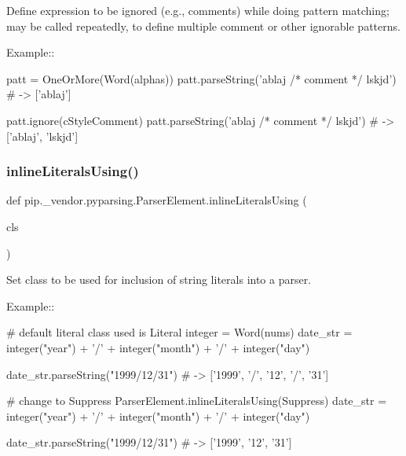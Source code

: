 \begin{DoxyVerb}Define expression to be ignored (e.g., comments) while doing pattern
matching; may be called repeatedly, to define multiple comment or other
ignorable patterns.

Example::

    patt = OneOrMore(Word(alphas))
    patt.parseString('ablaj /* comment */ lskjd') # -> ['ablaj']

    patt.ignore(cStyleComment)
    patt.parseString('ablaj /* comment */ lskjd') # -> ['ablaj', 'lskjd']
\end{DoxyVerb}
 \mbox{\label{classpip_1_1__vendor_1_1pyparsing_1_1ParserElement_abf245d50cf0b9de45b5453647caa1b71}} 
\subsubsection{\texorpdfstring{inline\+Literals\+Using()}{inlineLiteralsUsing()}}
{\footnotesize\ttfamily def pip.\+\_\+vendor.\+pyparsing.\+Parser\+Element.\+inline\+Literals\+Using (\begin{DoxyParamCaption}\item[{}]{cls }\end{DoxyParamCaption})\hspace{0.3cm}{\ttfamily [static]}}

\begin{DoxyVerb}Set class to be used for inclusion of string literals into a parser.

Example::

    # default literal class used is Literal
    integer = Word(nums)
    date_str = integer("year") + '/' + integer("month") + '/' + integer("day")

    date_str.parseString("1999/12/31")  # -> ['1999', '/', '12', '/', '31']


    # change to Suppress
    ParserElement.inlineLiteralsUsing(Suppress)
    date_str = integer("year") + '/' + integer("month") + '/' + integer("day")

    date_str.parseString("1999/12/31")  # -> ['1999', '12', '31']
\end{DoxyVerb}
 \mbox{\label{classpip_1_1__vendor_1_1pyparsing_1_1ParserElement_a5506c999238c1eecc7ac47af6cd699cb}} 
